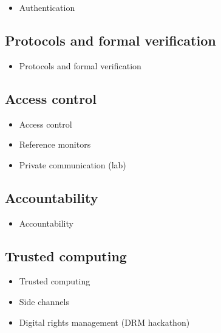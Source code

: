 \begin{frame}
  \begin{itemize}
    \item Authentication
  \end{itemize}
\end{frame}

\subsection{Protocols and formal verification}

\begin{frame}
  \begin{itemize}
    \item Protocols and formal verification
  \end{itemize}
\end{frame}

\subsection{Access control}

\begin{frame}
  \begin{itemize}
    \item Access control
    \item Reference monitors
    \item Private communication (lab)
  \end{itemize}
\end{frame}

\subsection{Accountability}

\begin{frame}
  \begin{itemize}
    \item Accountability
  \end{itemize}
\end{frame}

\subsection{Trusted computing}

\begin{frame}
  \begin{itemize}
    \item Trusted computing
    \item Side channels
    \item Digital rights management (DRM hackathon)
  \end{itemize}
\end{frame}

